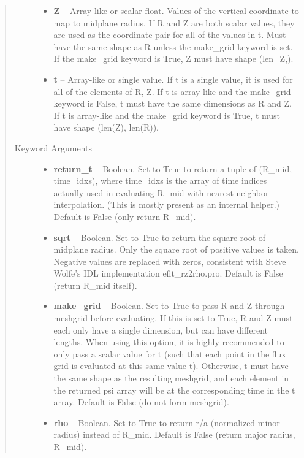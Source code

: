 \documentclass[letterpaper,10pt,english]{sphinxmanual}
\begin{document}
\begin{fulllineitems}
\begin{fulllineitems}
\begin{quote}
\begin{description}
\begin{itemize}
\item {} 
\textbf{Z} --
Array-like or scalar float. Values of the vertical coordinate to
map to midplane radius. If R and Z are both scalar values,
they are used as the coordinate pair for all of the values in t.
Must have the same shape as R unless the make\_grid keyword is
set. If the make\_grid keyword is True, Z must have shape (len\_Z,).

\item {} 
\textbf{t} --
Array-like or single value. If t is a single value, it is used
for all of the elements of R, Z. If t is array-like and the
make\_grid keyword is False, t must have the same dimensions as
R and Z. If t is array-like and the make\_grid keyword is True,
t must have shape (len(Z), len(R)).

\end{itemize}

\item[{Keyword Arguments}] \leavevmode\begin{itemize}
\item {} 
\textbf{return\_t} --
Boolean. Set to True to return a tuple of (R\_mid,
time\_idxs), where time\_idxs is the array of time indices
actually used in evaluating R\_mid with nearest-neighbor
interpolation. (This is mostly present as an internal helper.)
Default is False (only return R\_mid).

\item {} 
\textbf{sqrt} --
Boolean. Set to True to return the square root of midplane
radius. Only the square root of positive values is taken.
Negative values are replaced with zeros, consistent with Steve
Wolfe's IDL implementation efit\_rz2rho.pro. Default is False
(return R\_mid itself).

\item {} 
\textbf{make\_grid} --
Boolean. Set to True to pass R and Z through meshgrid
before evaluating. If this is set to True, R and Z must each
only have a single dimension, but can have different lengths.
When using this option, it is highly recommended to only pass
a scalar value for t (such that each point in the flux grid is
evaluated at this same value t). Otherwise, t must have the
same shape as the resulting meshgrid, and each element in the
returned psi array will be at the corresponding time in the t
array. Default is False (do not form meshgrid).

\item {} 
\textbf{rho} --
Boolean. Set to True to return r/a (normalized minor radius)
instead of R\_mid. Default is False (return major radius, R\_mid).


\end{itemize}
\end{description}
\end{quote}
\end{fulllineitems}
\end{fulllineitems}
\end{document}
